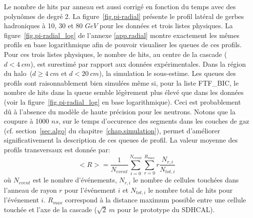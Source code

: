 Le nombre de hits par anneau est aussi corrigé en fonction du temps avec des polynômes de degré 2. La figure~\ref{fig.pi-radial} présente le profil latéral de gerbes hadroniques à 10, 30 et 80 $GeV$ pour les données et trois listes physiques. La figure~\ref{fig.pi-radial_log} de l'annexe \ref{app.radial} montre exactement les mêmes profils en base logarithmique afin de pouvoir visualiser les queues de ces profils. Pour ces trois listes physiques, le nombre de hits, au centre de la cascade ($d<4~cm$), est surestimé par rapport aux données expérimentales. Dans la région du halo~($d\geq4~cm$ et $d<20~cm$), la simulation le sous-estime. Les queues des profils sont raisonnablement bien simulées même si, pour la liste FTF\_BIC, le nombre de hits dans la queue semble légèrement plus élevé que dans les données (voir la figure~\ref{fig.pi-radial_log} en base logarithmique). Ceci est probablement dû à l'absence du modèle de haute précision pour les neutrons. Notons que la coupure à 1000 $ns$, sur le temps d'occurence des segments dans les couches de gaz (cf. section~\ref{sec.algo} du chapitre~\ref{chap.simulation}), permet d'améliorer significativement la description de ces queues de profil. La valeur moyenne des profils transversaux est donnée par:
\begin{equation}
  <R>=\frac{1}{N_{event}}\sum_{i=0}^{N_{event}}\sum_{r=0}^{R_{max}}r\frac{N_{r,i}}{N_{tot,i}}
\end{equation}
où $N_{event}$ est le nombre d'événements, $N_{r,i}$ le nombre de cellules touchées dans l'anneau de rayon $r$ pour l'événement $i$ et $N_{tot,i}$ le nombre total de hits pour l'événement $i$. $R_{max}$ correspond à la distance maximum possible entre une cellule touchée et l'axe de la cascade ($\sqrt{2}~m$ pour le prototype du SDHCAL).

